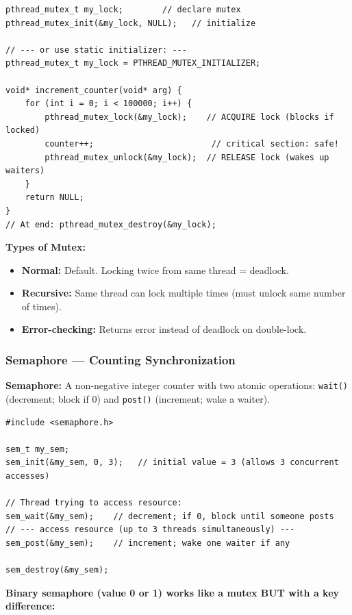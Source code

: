 \documentclass[11pt,a4paper]{article}
\newcommand{\code}[1]{\texttt{\small\colorbox{codebg}{\color{codekw}#1}}}
\newcommand{\term}[1]{\textbf{\color{darkblue}#1}}
\begin{document}
\begin{lstlisting}
pthread_mutex_t my_lock;        // declare mutex
pthread_mutex_init(&my_lock, NULL);   // initialize

// --- or use static initializer: ---
pthread_mutex_t my_lock = PTHREAD_MUTEX_INITIALIZER;

void* increment_counter(void* arg) {
    for (int i = 0; i < 100000; i++) {
        pthread_mutex_lock(&my_lock);    // ACQUIRE lock (blocks if locked)
        counter++;                        // critical section: safe!
        pthread_mutex_unlock(&my_lock);  // RELEASE lock (wakes up waiters)
    }
    return NULL;
}
// At end: pthread_mutex_destroy(&my_lock);
\end{lstlisting}

\textbf{Types of Mutex:}
\begin{itemize}[noitemsep]
  \item \term{Normal:} Default. Locking twice from same thread = deadlock.
  \item \term{Recursive:} Same thread can lock multiple times (must unlock same number of times).
  \item \term{Error-checking:} Returns error instead of deadlock on double-lock.
\end{itemize}

\subsubsection{Semaphore --- Counting Synchronization}

\begin{mydef}
\textbf{Semaphore:} A non-negative integer counter with two atomic operations: \code{wait()} (decrement; block if 0) and \code{post()} (increment; wake a waiter).
\end{mydef}

\begin{lstlisting}
#include <semaphore.h>

sem_t my_sem;
sem_init(&my_sem, 0, 3);   // initial value = 3 (allows 3 concurrent accesses)

// Thread trying to access resource:
sem_wait(&my_sem);    // decrement; if 0, block until someone posts
// --- access resource (up to 3 threads simultaneously) ---
sem_post(&my_sem);    // increment; wake one waiter if any

sem_destroy(&my_sem);
\end{lstlisting}

\textbf{Binary semaphore (value 0 or 1) works like a mutex BUT with a key difference:}
\end{document}

